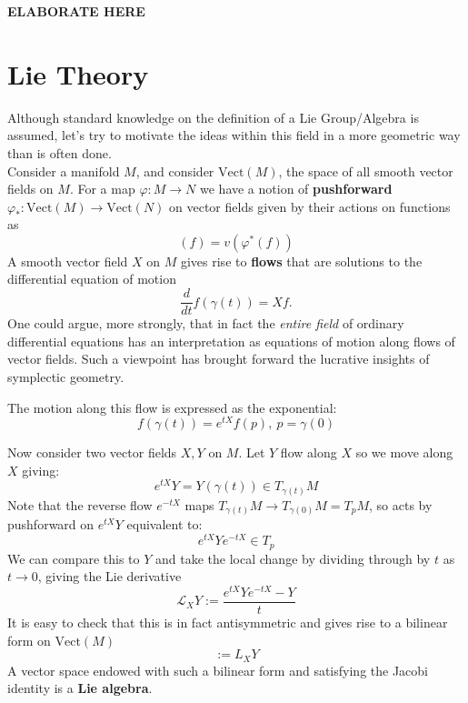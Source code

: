 		\textbf{ELABORATE HERE}
		
		\section{Lie Theory}
		
		Although standard knowledge on the definition of a Lie Group/Algebra is assumed, let's try to motivate the ideas within this field in a more geometric way than is often done. \\
		
		Consider a manifold $M$, and consider $\text{Vect}(M)$, the space of all smooth vector fields on $M$. For a map $\varphi: M \rightarrow N$ we have a notion of \textbf{pushforward} $\varphi_*: \text{Vect}(M) \rightarrow \text{Vect}(N)$ on vector fields given by their actions on functions as
		\begin{equation}
			[\varphi_* (v)] (f) = v (\varphi^* (f))
		\end{equation}
		A smooth vector field $X$ on $M$ gives rise to \textbf{flows} that are solutions to the differential equation of motion
		\begin{equation}
			\frac{d}{dt} f(\gamma(t)) = X f.
		\end{equation}
		One could argue, more strongly, that in fact the \emph{entire field} of ordinary differential equations has an interpretation as equations of motion along flows of vector fields. Such a viewpoint has brought forward the lucrative insights of symplectic geometry. 
		
		The motion along this flow is expressed as the exponential:
		\begin{equation}
			f(\gamma(t)) = e^{t X} f(p), ~ p = \gamma(0)
		\end{equation}
		
		Now consider two vector fields $X,Y$ on $M$. Let $Y$ flow along $X$ so we move along $X$ giving:
		\begin{equation}
			e^{tX} Y = Y(\gamma(t)) \in T_{\gamma(t)}M
		\end{equation}
		Note that the reverse flow $e^{-t X}$ maps $T_{\gamma(t)} M \to T_{\gamma(0)}M = T_pM$, so acts by pushforward on $e^{tX} Y$ equivalent to:
		\begin{equation}
			e^{tX} Y e^{-tX} \in T_p
		\end{equation}
		We can compare this to $Y$ and take the local change by dividing through by $t$ as $t \to 0$, giving the Lie derivative
		\begin{equation}
			\mathcal L_X Y := \frac{e^{tX} Y e^{-tX} - Y}{t}
		\end{equation}
		It is easy to check that this is in fact antisymmetric and gives rise to a bilinear form on $\mathrm{Vect}(M)$
		\begin{equation}
			[X,Y]:= L_X Y
		\end{equation}
		A vector space endowed with such a bilinear form and satisfying the Jacobi identity is a \textbf{Lie algebra}.
		

